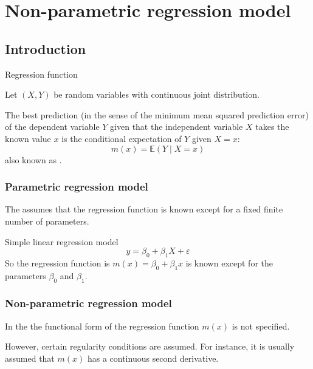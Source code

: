 \chapter{Non-parametric regression model}

\section{Introduction}

\begin{definition}{Regression function}{}

	Let $(X, Y)$ be random variables with continuous joint distribution.

	The best prediction (in the sense of the minimum mean squared prediction error)
	of the dependent variable $Y$ given that the independent variable $X$ takes
	the known value $x$ is the conditional expectation of $Y$ given $X=x$:
	\begin{equation*}
		m(x) = \mathds{E}( Y \mid X = x)
	\end{equation*}
	also known as .
\end{definition}

\subsection{Parametric regression model}

The  assumes that the regression function
is known except for a fixed finite number of parameters.

\begin{example}{Simple linear regression model}{}
	\begin{equation*}
		y = \beta_0 + \beta_1 X + \varepsilon
	\end{equation*}
	So the regression function is $m(x) = \beta_0 + \beta_1 x$ is known except
	for the parameters $\beta_0$ and $\beta_1$.
\end{example}

\subsection{Non-parametric regression model}

In the  the functional form of the
regression function $m(x)$ is not specified.

\begin{note}
	However, certain regularity conditions are assumed. For instance,
	it is usually assumed that $m(x)$ has a continuous second derivative.
\end{note}

